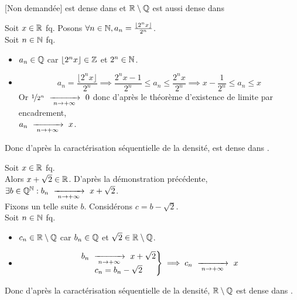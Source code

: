\documentclass{article}
\renewenvironment{question_kholle}[2][ ]
{
	\subsection{\texorpdfstring{#2}{}}
	\notblank{#1}
	{
		\noindent #1
		\bigbreak
	}
	{}
	\begin{proof}
}
{
	\end{proof}
}
\begin{document}
\begin{question_kholle}
	{[Non demandée] \Q est dense dans \R
		et $\mathbb R \setminus \mathbb Q$ est aussi dense dans \R}

	Soit $x \in \mathbb R$ fq.
	Posons $\forall n \in \mathbb N, a_n =
		\frac{\lfloor2^n x\rfloor}{2^n}$. \\
	Soit $n \in \mathbb N$ fq. \\
	\begin{itemize}
		\item $a_n \in \mathbb Q$ car $\lfloor2^n
			      x\rfloor \in \mathbb Z$ et $2^n \in \mathbb N$.
		\item
		      \begin{equation*}
			      a_n = \frac{\lfloor2^n x\rfloor}{2^n}
			      \implies \frac{2^n x - 1}{2^n}
			      \leqslant a_n \leqslant \frac{2^n x}{2^n}
			      \implies x - \frac{1}{2^n}
			      \leqslant a_n \leqslant x
		      \end{equation*}
		      Or $\nicefrac{1}{2^n}
			      \ \xrightarrow[\;n \to +\infty\;]{}\  0$ donc
		      d'après le théorème d'existence
		      de limite par encadrement,
		      \\ $a_n \ \xrightarrow[\;n \to +\infty\;]{}\  x$.
	\end{itemize}
	Donc d'après la caractérisation
	séquentielle de la densité, \Q est
	dense dans \R.
	\bigbreak

	\noindent Soit $x \in \mathbb R$ fq. \\
	Alors $x + \sqrt{2} \in \mathbb R$.
	D'après la démonstration précédente,
	$\exists b \in \mathbb Q^{\mathbb N} : b_n
		\ \xrightarrow[\;n \to +\infty\;]{}\  x + \sqrt{2}$. \\
	Fixons un telle suite $b$.
	Considérons $c = b - \sqrt{2}$. \\
	Soit $n \in \mathbb N$ fq.
	\begin{itemize}
		\item $c_n \in \mathbb R\setminus\mathbb Q$ car
		      $b_n \in \mathbb Q$ et $\sqrt{2} \in \mathbb R
			      \setminus \mathbb Q$.
		\item
		      \begin{equation*}
			      \left.
			      \begin{matrix}
				      b_n \ \xrightarrow[\;n \to +\infty\;]{}\  x +
				      \sqrt{2} \\
				      c_n = b_n - \sqrt{2}
			      \end{matrix} \right\}
			      \implies c_n \ \xrightarrow[\;n \to +\infty\;]{}\  x
		      \end{equation*}
	\end{itemize}
	Donc d'après la caractérisation
	séquentielle de la densité,
	$\mathbb R\setminus \mathbb Q$ est dense dans \R.
\end{question_kholle}
\end{document}
